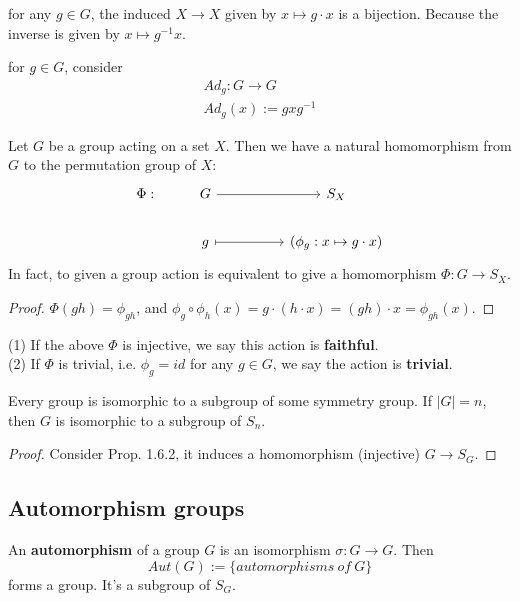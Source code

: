 \documentclass[11pt,fleqn]{book} %
\begin{document}
\begin{CJK}{UTF8}{gkai}
\begin{remark}
	for any $g\in G$, the induced $X \to X$ given by $x \mapsto g\cdot x$ is a bijection. Because the inverse is given by $x \mapsto g^{-1} x$.
\end{remark}

\begin{definition}
	 for $g\in G$, consider 
	\begin{align*}
		Ad_g: G \to G \\
		Ad_g(x) := gxg^{-1}
	\end{align*}
\end{definition}

\begin{proposition}
	Let $G$ be a group acting on a set $X$. Then we have a natural homomorphism from $G$ to the permutation group of $X$:
	\[\begin{tikzcd}
		{\Phi:} & G && {S_X} \\
		& g && {(\phi_g:x\mapsto g\cdot x)}
		\arrow[from=1-2, to=1-4]
		\arrow[maps to, from=2-2, to=2-4]
	\end{tikzcd}\]
	In fact, to given a group action is equivalent to give a homomorphism $\Phi:G\to S_X$.
\end{proposition}
\begin{proof}
	$\Phi(gh) = \phi_{gh}$, and $\phi_g \circ \phi_h (x) = g\cdot(h\cdot x) = (gh)\cdot x = \phi_{gh}(x)$.
\end{proof}

\begin{definition}
	(1) If the above $\Phi$ is injective, we say this action is {\bf faithful}. \\
	(2) If $\Phi$ is trivial, i.e. $\phi_g = id$ for any $g \in G$, we say the action is {\bf trivial}.
\end{definition}

\begin{theorem}
	[Cayley] Every group is isomorphic to a subgroup of some symmetry group. If $|G| = n$, then $G$ is isomorphic to a subgroup of $S_n$.
\end{theorem}
\begin{proof}
	Consider Prop. 1.6.2, it induces a homomorphism (injective) $G \to S_G$.
\end{proof}

\subsection{Automorphism groups}
\begin{definition}
	An {\bf automorphism} of a group $G$ is an isomorphism $\sigma: G \to G$. Then 
	\[Aut(G) := \{automorphisms \ of \ G\}\] 
	forms a group. It's a subgroup of $S_G$.
\end{definition}


\end{CJK}
\end{document}
